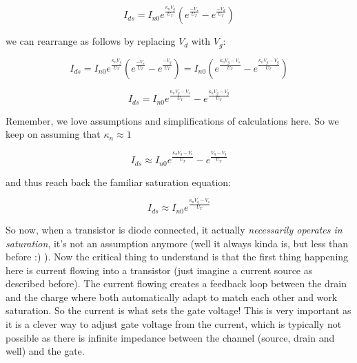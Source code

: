 \begin{equation}
I_{ds} = I_{n0} e^{\frac{\kappa_{n}V_g}{U_T}}(e^\frac{-V_s}{U_T} - e^\frac{-V_d}{U_T})
\end{equation} 

we can rearrange as follows by replacing $V_d$ with $V_g$: 

\begin{equation}
I_{ds} = I_{n0} e^{\frac{\kappa_{n}V_g}{U_T}}(e^\frac{-V_s}{U_T} - e^\frac{-V_g}{U_T}) = I_{n0} (e^{\frac{\kappa_{n}V_g - V_s}{U_T}} - e^\frac{\kappa_{n}V_g - V_g}{U_T})
\end{equation}

\begin{equation}
I_{ds} = I_{n0} e^{\frac{\kappa_{n}V_g - V_s}{U_T}} - e^\frac{\kappa_{n}V_g - V_g}{U_T}
\end{equation}

Remember, we love assumptions and simplifications of calculations here. So we keep on assuming that $\kappa_n \approx 1$ 

\begin{equation}
    I_{ds} \approx I_{n0} e^{\frac{\kappa_{n}V_g - V_s}{U_T}} - e^\frac{V_g- V_g}{U_T}
\end{equation}

and thus reach back the familiar saturation equation:

\begin{equation}
I_{ds} \approx I_{n0} e^{\frac{\kappa_{n}V_g - V_s}{U_T}}
\end{equation}

So now, when a transistor is diode connected, it actually \emph{necessarily operates in saturation}, it's not an assumption anymore (well it always kinda is, but less than before :) ). Now the critical thing to understand is that the first thing happening here is current flowing into a transistor (just imagine a current source as described before). The current flowing creates a feedback loop between the drain and the charge where both automatically adapt to match each other and work saturation. So the current is what sets the gate voltage! This is very important as it is a clever way to adjust gate voltage from the current, which is typically not possible as there is infinite impedance between the channel (source, drain and well) and the gate. 